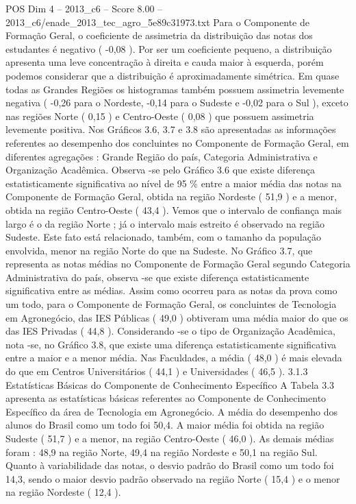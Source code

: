 \begin{textsample}{POS Dim 4 – 2013\_c6 – Score 8.00 – 2013\_c6/enade\_2013\_tec\_agro\_5e89c31973.txt}
Para o Componente de Formação Geral, o coeficiente de assimetria da distribuição das notas dos estudantes é negativo ( -0,08 ).
Por ser um coeficiente pequeno, a distribuição apresenta uma leve concentração à direita e cauda maior à esquerda, porém podemos considerar que a distribuição é aproximadamente simétrica.
Em quase todas as Grandes Regiões os histogramas também possuem assimetria levemente negativa ( -0,26 para o Nordeste, -0,14 para o Sudeste e -0,02 para o Sul ), exceto nas regiões Norte ( 0,15 ) e Centro-Oeste ( 0,08 ) que possuem assimetria levemente positiva.
Nos Gráficos 3.6, 3.7 e 3.8 são apresentadas as informações referentes ao desempenho dos concluintes no Componente de Formação Geral, em diferentes agregações : Grande Região do país, Categoria Administrativa e Organização Acadêmica.
Observa -se pelo Gráfico 3.6 que existe diferença estatisticamente significativa ao nível de 95 \% entre a maior média das notas na Componente de Formação Geral, obtida na região Nordeste ( 51,9 ) e a menor, obtida na região Centro-Oeste ( 43,4 ).
Vemos que o intervalo de confiança mais largo é o da região Norte ; já o intervalo mais estreito é observado na região Sudeste.
Este fato está relacionado, também, com o tamanho da população envolvida, menor na região Norte do que na Sudeste.
No Gráfico 3.7, que representa as notas médias no Componente de Formação Geral segundo Categoria Administrativa do país, observa -se que existe diferença estatisticamente significativa entre as médias.
Assim como ocorreu para as notas da prova como um todo, para o Componente de Formação Geral, os concluintes de Tecnologia em Agronegócio, das IES Públicas ( 49,0 ) obtiveram uma média maior do que os das IES Privadas ( 44,8 ).
Considerando -se o tipo de Organização Acadêmica, nota -se, no Gráfico 3.8, que existe uma diferença estatisticamente significativa entre a maior e a menor média.
Nas Faculdades, a média ( 48,0 ) é mais elevada do que em Centros Universitários ( 44,1 ) e Universidades ( 46,5 ). 3.1.3 Estatísticas Básicas do Componente de Conhecimento Específico A Tabela 3.3 apresenta as estatísticas básicas referentes ao Componente de Conhecimento Específico da área de Tecnologia em Agronegócio.
A média do desempenho dos alunos do Brasil como um todo foi 50,4.
A maior média foi obtida na região Sudeste ( 51,7 ) e a menor, na região Centro-Oeste ( 46,0 ).
As demais médias foram : 48,9 na região Norte, 49,4 na região Nordeste e 50,1 na região Sul.
Quanto à variabilidade das notas, o desvio padrão do Brasil como um todo foi 14,3, sendo o maior desvio padrão observado na região Norte ( 15,4 ) e o menor na região Nordeste ( 12,4 ).

\end{textsample}
